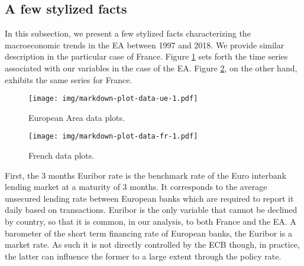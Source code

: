 \documentclass[
  11pt,
]{article}
\begin{document}
\hypertarget{a-few-stylized-facts}{%
\subsection{A few stylized facts}\label{a-few-stylized-facts}}

In this subsection, we present a few stylized facts characterizing the macroeconomic trends in the EA between 1997 and 2018. We provide similar description in the particular case of France. Figure \ref{fig:plot-data-ue} sets forth the time series associated with our variables in the case of the EA. Figure \ref{fig:plot-data-fr}, on the other hand, exhibits the same series for France.

\begin{figure}
\centering
\texttt{[image: img/markdown-plot-data-ue-1.pdf]}
\caption{\label{fig:plot-data-ue}European Area data plots.}
\end{figure}

\begin{figure}
\centering
\texttt{[image: img/markdown-plot-data-fr-1.pdf]}
\caption{\label{fig:plot-data-fr}French data plots.}
\end{figure}

First, the 3 months Euribor rate is the benchmark rate of the Euro interbank lending market at a maturity of 3 months. It corresponds to the average unsecured lending rate between European banks which are required to report it daily based on transactions. Euribor is the only variable that cannot be declined by country, so that it is common, in our analysis, to both France and the EA. A barometer of the short term financing rate of European banks, the Euribor is a market rate. As such it is not directly controlled by the ECB though, in practice, the latter can influence the former to a large extent through the policy rate.
\end{document}

